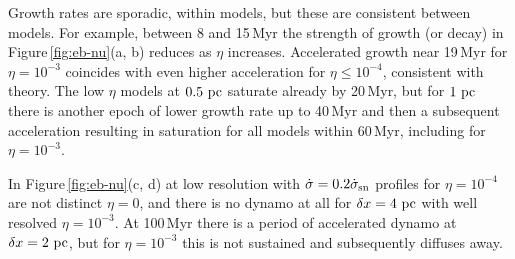 \documentclass[preprint2]{aastex63}
\newcommand\SNr{\dot\sigma_{\rm sn}}
\newcommand\pc{~ {\rm pc}}
\newcommand\dx{ {\delta x}}
\begin{document}
%
 Growth rates are sporadic, within models, but these are consistent between
 models.
 For example, between 8 and 15\,Myr the strength of growth (or decay) in 
 Figure\,\ref{fig:eb-nu}(a, b) reduces as $\eta$ increases.
 Accelerated growth near 19\,Myr for $\eta=10^{-3}$ coincides with
 even higher acceleration for $\eta\le10^{-4}$, consistent with theory.
 The low $\eta$ models at $0.5\pc$ saturate already by 20\,Myr, but for $1\pc$
 there is another epoch of lower growth rate up to 40\,Myr and then a
 subsequent acceleration resulting in saturation for all models within
 60\,Myr, including for $\eta=10^{-3}$.


 In Figure\,\ref{fig:eb-nu}(c, d) at low resolution with
 $\dot\sigma=0.2\SNr$ profiles for $\eta=10^{-4}$ are not distinct $\eta=0$,
 and there is no dynamo at all for $\dx=4\pc$ with well resolved $\eta=10^{-3}$.
 At 100\,Myr there is a period of accelerated dynamo at $\dx=2\pc$, but 
 for $\eta=10^{-3}$ this is not sustained and subsequently diffuses away.
\end{document}
